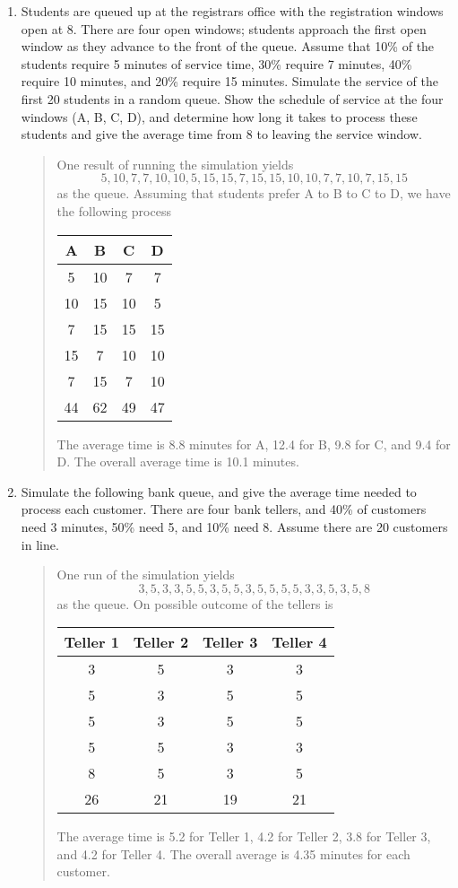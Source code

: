 \documentclass{hw}
\begin{document}
\begin{enumerate}
\newpage
\item Students are queued up at the registrars office with the registration windows open at 8. There are
four open windows; students approach the first open window as they advance to the front of the queue.
Assume that 10\% of the students require 5 minutes of service time, 30\% require 7 minutes, 40\% require 10
minutes, and 20\% require 15 minutes. Simulate the service of the first 20 students in a random queue. Show
the schedule of service at the four windows (A, B, C, D), and determine how long it takes to process these
students and give the average time from 8 to leaving the service window.
\begin{quote}
One result of running the simulation yields
\[5,10,7,7,10,10,5,15,15,7,15,15,10,10,7,7,10,7,15,15\]
as the queue. Assuming that students prefer A to B to C to D, we have the following process
\begin{center}
\begin{tabular}{c | c | c | c}
A & B & C & D\\
\hline
5 & 10 & 7 & 7\\
10 & 15 & 10 & 5\\
7 & 15 & 15 & 15\\
15 & 7 & 10 & 10\\
7 & 15 & 7 & 10\\
\hline
44 & 62 & 49 & 47
\end{tabular}
\end{center}
The average time is 8.8 minutes for A, 12.4 for B, 9.8 for C, and 9.4 for D. The overall average time
is 10.1 minutes.
\end{quote}

\item Simulate the following bank queue, and give the average time needed to process each customer.
There are four bank tellers, and 40\% of customers need 3 minutes, 50\% need 5, and 10\% need 8. Assume
there are 20 customers in line.
\begin{quote}
One run of the simulation yields
\[3,5,3,3,5,5,3,5,5,3,5,5,5,5,3,3,5,3,5,8\]
as the queue. On possible outcome of the tellers is
\begin{center}
\begin{tabular}{c | c | c | c}
Teller 1 & Teller 2 & Teller 3 & Teller 4\\
\hline
3 & 5 & 3 & 3\\
5 & 3 & 5 & 5\\
5 & 3 & 5 & 5\\
5 & 5 & 3 & 3\\
8 & 5 & 3 & 5\\
\hline
26 & 21 & 19 & 21
\end{tabular}
\end{center}
The average time is 5.2 for Teller 1, 4.2 for Teller 2, 3.8 for Teller 3, and 4.2 for Teller 4. The
overall average is 4.35 minutes for each customer.
\end{quote}


\end{enumerate}
\end{document}
